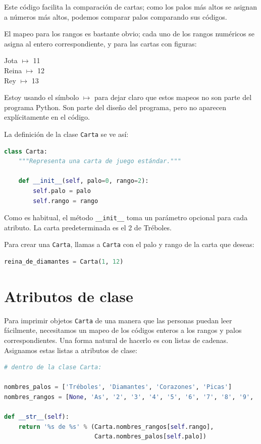 Este código facilita la comparación de cartas; como los palos más altos se asignan a números más altos, podemos comparar palos comparando sus códigos.

El mapeo para los rangos es bastante obvio; cada uno de los rangos numéricos se asigna al entero correspondiente, y para las cartas con figuras:

\begin{center}
Jota  $\mapsto$  11 \\
Reina  $\mapsto$  12 \\
Rey  $\mapsto$  13 \\
\end{center}

Estoy usando el símbolo $\mapsto$ para dejar claro que estos mapeos no son parte del programa Python. Son parte del diseño del programa, pero no aparecen explícitamente en el código.

La definición de la clase \texttt{Carta} se ve así:

\begin{lstlisting}[language=Python]
class Carta:
    """Representa una carta de juego estándar."""

    def __init__(self, palo=0, rango=2):
        self.palo = palo
        self.rango = rango
\end{lstlisting}

Como es habitual, el método \texttt{\_\_init\_\_} toma un parámetro opcional para cada atributo. La carta predeterminada es el 2 de Tréboles.

Para crear una \texttt{Carta}, llamas a \texttt{Carta} con el palo y rango de la carta que deseas:

\begin{lstlisting}[language=Python]
reina_de_diamantes = Carta(1, 12)
\end{lstlisting}

\section{Atributos de clase}

Para imprimir objetos \texttt{Carta} de una manera que las personas puedan leer fácilmente, necesitamos un mapeo de los códigos enteros a los rangos y palos correspondientes. Una forma natural de hacerlo es con listas de cadenas. Asignamos estas listas a atributos de clase:

\begin{lstlisting}[language=Python]
# dentro de la clase Carta:

nombres_palos = ['Tréboles', 'Diamantes', 'Corazones', 'Picas']
nombres_rangos = [None, 'As', '2', '3', '4', '5', '6', '7', '8', '9', '10', 'Jota', 'Reina', 'Rey']

def __str__(self):
    return '%s de %s' % (Carta.nombres_rangos[self.rango],
                         Carta.nombres_palos[self.palo])
\end{lstlisting}

